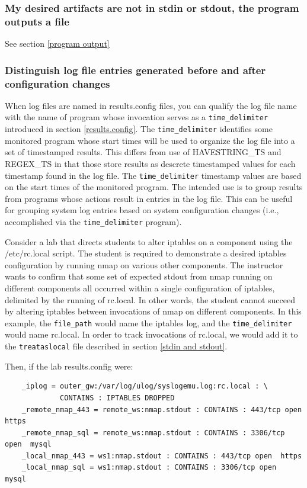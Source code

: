 \documentclass[12pt]{article}
\begin{document}
\subsubsection{My desired artifacts are not in stdin or stdout, the program outputs a file}
See section \ref{program output}

\subsubsection{Distinguish log file entries generated before and after configuration changes}
\label{time delimeter}
When log files are named in results.config files, you can qualify the log file name
with the name of program whose invocation serves as a {\tt time\_delimiter} introduced
in section \ref{results.config}.
The {\tt time\_delimiter} identifies some
monitored program whose start times will be used to organize the log file into
a set of timestamped results.  This differs from use of HAVESTRING\_TS and
REGEX\_TS in that those store results as descrete timestamped values for each
timestamp found in the log file.  The {\tt time\_delimiter} timestamp values are
based on the start times of the monitored program.  The intended use is to
group results from programs whose actions result in entries in the log file.
This can be useful for grouping system log entries based on system configuration
changes (i.e., accomplished via the {\tt time\_delimiter} program). 

Consider a lab that directs students to alter iptables on a component using the
/etc/rc.local script.  The student is required to demonstrate a desired iptables
configuration by running nmap on various other components.  The instructor wants 
to confirm that some set of expected stdout from nmap running on different
components all occurred within a single
configuration of iptables, delimited by the running of rc.local.  In other words,
the student cannot succeed by altering iptables between invocations of nmap on
different components.  In this example, the {\tt file\_path} would name the iptables
log, and the {\tt time\_delimiter} would name rc.local.  In order to track invocations
of rc.local, we would add it to the {\tt treataslocal} file described in section \ref{stdin and stdout}.

Then, if the lab results.config were:
\begin{verbatim}
    _iplog = outer_gw:/var/log/ulog/syslogemu.log:rc.local : \
             CONTAINS : IPTABLES DROPPED
    _remote_nmap_443 = remote_ws:nmap.stdout : CONTAINS : 443/tcp open  https
    _remote_nmap_sql = remote_ws:nmap.stdout : CONTAINS : 3306/tcp open  mysql
    _local_nmap_443 = ws1:nmap.stdout : CONTAINS : 443/tcp open  https
    _local_nmap_sql = ws1:nmap.stdout : CONTAINS : 3306/tcp open  mysql
\end{verbatim}
\end{document}

